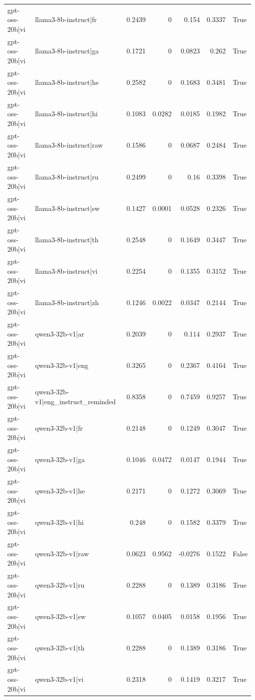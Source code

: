 \begin{table}
\begin{tabular}{l l r r r r l}
gpt-oss-20b|vi & llama3-8b-instruct|fr & 0.2439 & 0 & 0.154 & 0.3337 & True \\
gpt-oss-20b|vi & llama3-8b-instruct|ga & 0.1721 & 0 & 0.0823 & 0.262 & True \\
gpt-oss-20b|vi & llama3-8b-instruct|he & 0.2582 & 0 & 0.1683 & 0.3481 & True \\
gpt-oss-20b|vi & llama3-8b-instruct|hi & 0.1083 & 0.0282 & 0.0185 & 0.1982 & True \\
gpt-oss-20b|vi & llama3-8b-instruct|raw & 0.1586 & 0 & 0.0687 & 0.2484 & True \\
gpt-oss-20b|vi & llama3-8b-instruct|ru & 0.2499 & 0 & 0.16 & 0.3398 & True \\
gpt-oss-20b|vi & llama3-8b-instruct|sw & 0.1427 & 0.0001 & 0.0528 & 0.2326 & True \\
gpt-oss-20b|vi & llama3-8b-instruct|th & 0.2548 & 0 & 0.1649 & 0.3447 & True \\
gpt-oss-20b|vi & llama3-8b-instruct|vi & 0.2254 & 0 & 0.1355 & 0.3152 & True \\
gpt-oss-20b|vi & llama3-8b-instruct|zh & 0.1246 & 0.0022 & 0.0347 & 0.2144 & True \\
gpt-oss-20b|vi & qwen3-32b-v1|ar & 0.2039 & 0 & 0.114 & 0.2937 & True \\
gpt-oss-20b|vi & qwen3-32b-v1|eng & 0.3265 & 0 & 0.2367 & 0.4164 & True \\
gpt-oss-20b|vi & qwen3-32b-v1|eng_instruct_reminded & 0.8358 & 0 & 0.7459 & 0.9257 & True \\
gpt-oss-20b|vi & qwen3-32b-v1|fr & 0.2148 & 0 & 0.1249 & 0.3047 & True \\
gpt-oss-20b|vi & qwen3-32b-v1|ga & 0.1046 & 0.0472 & 0.0147 & 0.1944 & True \\
gpt-oss-20b|vi & qwen3-32b-v1|he & 0.2171 & 0 & 0.1272 & 0.3069 & True \\
gpt-oss-20b|vi & qwen3-32b-v1|hi & 0.248 & 0 & 0.1582 & 0.3379 & True \\
gpt-oss-20b|vi & qwen3-32b-v1|raw & 0.0623 & 0.9562 & -0.0276 & 0.1522 & False \\
gpt-oss-20b|vi & qwen3-32b-v1|ru & 0.2288 & 0 & 0.1389 & 0.3186 & True \\
gpt-oss-20b|vi & qwen3-32b-v1|sw & 0.1057 & 0.0405 & 0.0158 & 0.1956 & True \\
gpt-oss-20b|vi & qwen3-32b-v1|th & 0.2288 & 0 & 0.1389 & 0.3186 & True \\
gpt-oss-20b|vi & qwen3-32b-v1|vi & 0.2318 & 0 & 0.1419 & 0.3217 & True \\

\end{tabular}
\end{table}
